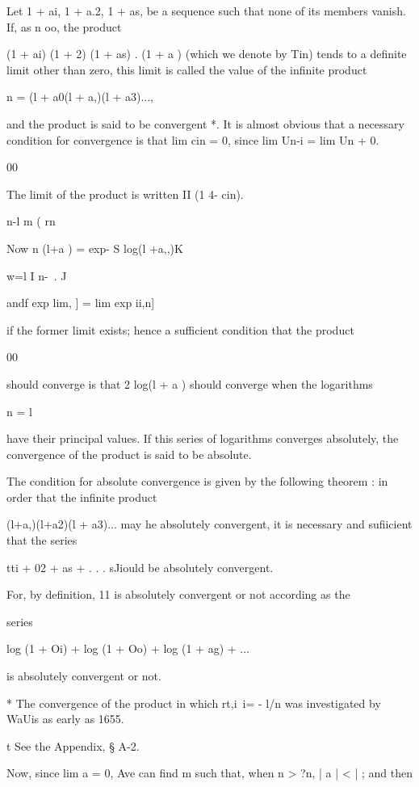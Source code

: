 Let 1 + ai, 1 + a.2, 1 + as,    be a sequence such that none of its
members vanish. If, as n oo, the product

(1 + ai) (1 + 2) (1 + as)   . (1 + a ) (which we denote by Tin)
tends to a definite limit other than zero, this limit is called the
value of the infinite product

n = (l + a0(l + a,)(l + a3)...,

and the product is said to be convergent *. It is almost obvious that
a necessary condition for convergence is that lim cin = 0, since lim
Un-i = lim Un + 0.

00

The limit of the product is written II (1 4- cin).

n-l m ( rn \

Now n (l+a ) = exp- S log(l +a,,)K

w=l I n-\ . J

andf exp lim, ] = lim exp ii,n]

if the former limit exists; hence a sufficient condition that the
product

00

should converge is that 2 log(l + a ) should converge when the
logarithms

n = l

have their principal values. If this series of logarithms converges
absolutely, the convergence of the product is said to be absolute.

The condition for absolute convergence is given by the following
theorem : in order that the infinite product

(l+a,)(l+a2)(l + a3)... may he absolutely convergent, it is necessary
and sufiicient that the series

tti + 02 + as + . . . sJiould be absolutely convergent.

For, by definition, 11 is absolutely convergent or not according as
the

series

log (1 + Oi) + log (1 + Oo) + log (1 + ag) + ...

is absolutely convergent or not.

* The convergence of the product in which rt,i\ i= - l/n was
investigated by WaUis as early as 1655.

t See the Appendix, § A-2.

%
%

Now, since lim a = 0, Ave can find m such that, when n > ?n, | a | < |
; and then

